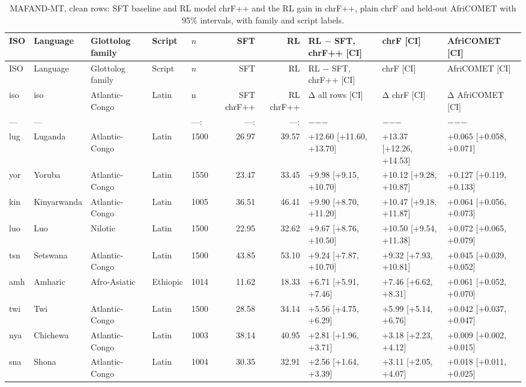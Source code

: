 {\scriptsize\setlength{\tabcolsep}{1.5pt}
\begin{longtable}{@{}lllllrrlll@{}}
\caption{MAFAND-MT, clean rows: SFT baseline and RL model chrF++ and the RL gain in chrF++, plain chrF and held-out AfriCOMET with 95\% intervals, with family and script labels.}\label{tab:rl-sft-mafand-fam}\\
\toprule
ISO & Language & Glottolog family & Script & $n$ & SFT & RL & RL $-$ SFT, chrF++ [CI] & chrF [CI] & AfriCOMET [CI] \\
\midrule\endfirsthead
\toprule
ISO & Language & Glottolog family & Script & $n$ & SFT & RL & RL $-$ SFT, chrF++ [CI] & chrF [CI] & AfriCOMET [CI] \\
\midrule\endhead
\midrule\endfoot
\bottomrule\endlastfoot
iso & iso & Atlantic-Congo & Latin & n & SFT chrF++ & RL chrF++ & Δ all rows [CI] & Δ chrF [CI] & Δ AfriCOMET [CI] \\
--- & --- &  &  & ---: & ---: & ---: & $-$$-$$-$ & $-$$-$$-$ & $-$$-$$-$ \\
lug & Luganda & Atlantic-Congo & Latin & 1500 & 26.97 & 39.57 & +12.60 [+11.60, +13.70] & +13.37 [+12.26, +14.53] & +0.065 [+0.058, +0.071] \\
yor & Yoruba & Atlantic-Congo & Latin & 1550 & 23.47 & 33.45 & +9.98 [+9.15, +10.70] & +10.12 [+9.28, +10.87] & +0.127 [+0.119, +0.133] \\
kin & Kinyarwanda & Atlantic-Congo & Latin & 1005 & 36.51 & 46.41 & +9.90 [+8.70, +11.20] & +10.47 [+9.18, +11.87] & +0.064 [+0.056, +0.073] \\
luo & Luo & Nilotic & Latin & 1500 & 22.95 & 32.62 & +9.67 [+8.76, +10.50] & +10.50 [+9.54, +11.38] & +0.072 [+0.065, +0.079] \\
tsn & Setswana & Atlantic-Congo & Latin & 1500 & 43.85 & 53.10 & +9.24 [+7.87, +10.70] & +9.32 [+7.93, +10.81] & +0.045 [+0.039, +0.052] \\
amh & Amharic & Afro-Asiatic & Ethiopic & 1014 & 11.62 & 18.33 & +6.71 [+5.91, +7.46] & +7.46 [+6.62, +8.31] & +0.061 [+0.052, +0.070] \\
twi & Twi & Atlantic-Congo & Latin & 1500 & 28.58 & 34.14 & +5.56 [+4.75, +6.29] & +5.99 [+5.14, +6.76] & +0.042 [+0.037, +0.047] \\
nya & Chichewa & Atlantic-Congo & Latin & 1003 & 38.14 & 40.95 & +2.81 [+1.96, +3.71] & +3.18 [+2.23, +4.12] & +0.009 [+0.002, +0.015] \\
sna & Shona & Atlantic-Congo & Latin & 1004 & 30.35 & 32.91 & +2.56 [+1.64, +3.39] & +3.11 [+2.05, +4.07] & +0.018 [+0.011, +0.025] \\

\end{longtable}}
